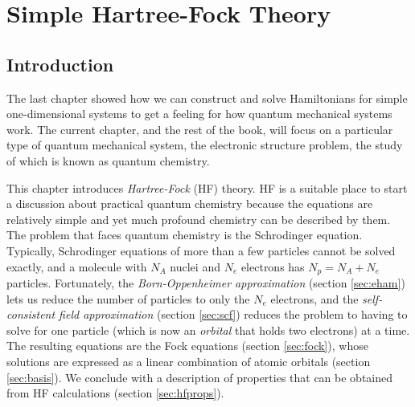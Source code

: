 \chapter{Simple Hartree-Fock Theory}
\label{chap:simplehf}

\section{Introduction}
The last chapter showed how we can construct and solve Hamiltonians
for simple one-dimensional systems to get a feeling for how quantum
mechanical systems work. The current chapter, and the rest of the
book, will focus on a particular type of quantum mechanical system,
the electronic structure problem, the study of which is known as
quantum chemistry.

This chapter introduces \emph{Hartree-Fock} (HF) theory. HF is a
suitable place to start a discussion about practical quantum chemistry
because the equations are relatively simple and yet much profound
chemistry can be described by them. The problem that faces quantum
chemistry is the Schrodinger equation. Typically, Schrodinger
equations of more than a few particles cannot be solved exactly, and a
molecule with $N_A$ nuclei and $N_e$ electrons has $N_p = N_A + N_e$
particles. Fortunately, the \emph{Born-Oppenheimer approximation}
(section \ref{sec:eham}) lets us reduce the number of particles to
only the $N_e$ electrons, and the \emph{self-consistent field
approximation} (section \ref{sec:scf}) reduces the problem to having
to solve for one particle (which is now an \emph{orbital} that holds
two electrons) at a time. The resulting equations are the Fock
equations (section \ref{sec:fock}), whose solutions are expressed as a
linear combination of atomic orbitals (section \ref{sec:basis}). We
conclude with a description of properties that can be obtained from HF
calculations (section \ref{sec:hfprops}).

